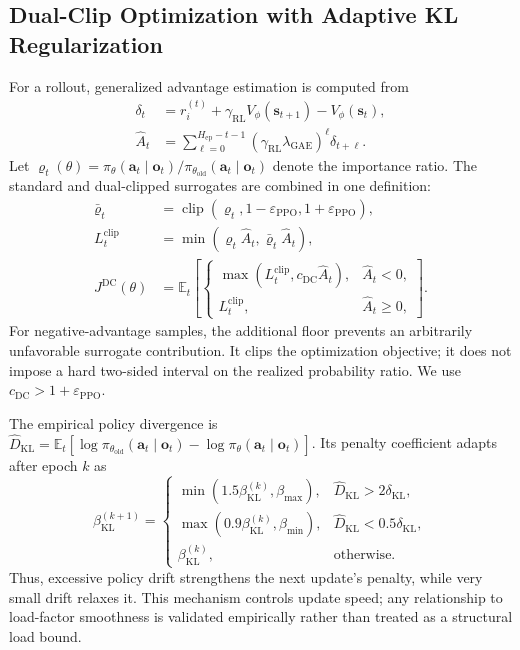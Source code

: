 \documentclass[lettersize,journal]{IEEEtran}
\begin{document}
\subsection{Dual-Clip Optimization with Adaptive KL Regularization}
\label{subsec:dual_clip_kl}

For a rollout, generalized advantage estimation is computed from
\begin{equation}
\label{eq:gae}
\begin{aligned}
\delta_t&=r_i^{(t)}+\gamma_{\mathrm{RL}}V_{\phi}(\mathbf s_{t+1})
-V_{\phi}(\mathbf s_t),\\
\widehat A_t&=\sum_{\ell=0}^{H_{\mathrm{ep}}-t-1}
(\gamma_{\mathrm{RL}}\lambda_{\mathrm{GAE}})^{\ell}\delta_{t+\ell}.
\end{aligned}
\end{equation}
Let $\varrho_t(\theta)=\pi_{\theta}(\mathbf a_t\mid\mathbf o_t)/
\pi_{\theta_{\mathrm{old}}}(\mathbf a_t\mid\mathbf o_t)$ denote the importance ratio. The
standard and dual-clipped surrogates are combined in one definition:
\begin{equation}
\label{eq:dual_clip}
\begin{aligned}
\bar\varrho_t&=\operatorname{clip}
(\varrho_t,1-\varepsilon_{\mathrm{PPO}},1+\varepsilon_{\mathrm{PPO}}),\\
L_t^{\mathrm{clip}}&=\min(\varrho_t\widehat A_t,
\bar\varrho_t\widehat A_t),\\
J^{\mathrm{DC}}(\theta)&=\mathbb E_t\!\left[
\begin{cases}
\max(L_t^{\mathrm{clip}},c_{\mathrm{DC}}\widehat A_t),&\widehat A_t<0,\\
L_t^{\mathrm{clip}},&\widehat A_t\geq0,
\end{cases}\right].
\end{aligned}
\end{equation}
For negative-advantage samples, the additional floor prevents an arbitrarily unfavorable
surrogate contribution. It clips the optimization objective; it does not impose a hard
two-sided interval on the realized probability ratio. We use
$c_{\mathrm{DC}}>1+\varepsilon_{\mathrm{PPO}}$.

The empirical policy divergence is
$\widehat D_{\mathrm{KL}}=\mathbb E_t[\log\pi_{\theta_{\mathrm{old}}}
(\mathbf a_t\mid\mathbf o_t)-\log\pi_{\theta}(\mathbf a_t\mid\mathbf o_t)]$. Its penalty
coefficient adapts after epoch $k$ as
\begin{equation}
\label{eq:kl_adaptation}
\beta_{\mathrm{KL}}^{(k+1)}=
\begin{cases}
\min(1.5\beta_{\mathrm{KL}}^{(k)},\beta_{\max}),
&\widehat D_{\mathrm{KL}}>2\delta_{\mathrm{KL}},\\
\max(0.9\beta_{\mathrm{KL}}^{(k)},\beta_{\min}),
&\widehat D_{\mathrm{KL}}<0.5\delta_{\mathrm{KL}},\\
\beta_{\mathrm{KL}}^{(k)},&\text{otherwise}.
\end{cases}
\end{equation}
Thus, excessive policy drift strengthens the next update's penalty, while very small drift
relaxes it. This mechanism controls update speed; any relationship to load-factor smoothness is
validated empirically rather than treated as a structural load bound.
\end{document}
